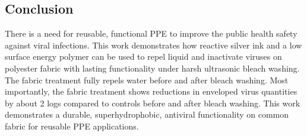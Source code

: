 \documentclass[journal=jacsat,manuscript=article]{achemso}
\begin{document}
\subsection{Conclusion}
There is a need for reusable, functional PPE to improve the public health safety against viral infections. This work demonstrates how reactive %
silver ink and a low surface energy polymer can be used to repel liquid and inactivate viruses on polyester fabric with lasting functionality under harsh ultrasonic bleach washing. The fabric treatment fully repels water before and after bleach washing. Most importantly, the fabric treatment shows reductions in enveloped virus quantities by about 2 logs compared to controls before and after bleach washing. %
This work demonstrates a durable, superhydrophobic, antiviral functionality on common fabric for reusable PPE applications.






\end{document}
